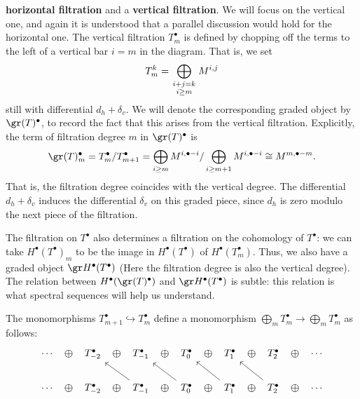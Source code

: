 \textbf{horizontal filtration} and a \textbf{vertical filtration}. We will focus on the vertical one, and again it is understood that a parallel discussion would hold 
for the horizontal one. The vertical filtration $T^\bullet_m$ is defined by chopping off the terms to the left of a vertical bar $i=m$ in the diagram. That is, we set
\[T_m^k=\bigoplus_{\substack{i+j=k\atop i\geq m}}M^{i,j}\]
still with differential $d_h+\delta_v$. We will denote the corresponding graded object by $\gr(T)^\bullet$, to record the fact that this arises from the 
vertical filtration. Explicitly, the term of filtration degree $m$ in $\gr(T)^\bullet$ is 
\[\gr(T)^\bullet_m=T^\bullet_m/T^\bullet_{m+1}=\bigoplus_{i\geq m}M^{i,\bullet-i}/\bigoplus_{i\geq m+1}M^{i,\bullet-i}\cong M^{m,\bullet-m}.\]
That is, the filtration degree coincides with the vertical degree. The differential $d_h+\delta_v$ induces the differential $\delta_v$ on this graded piece, since 
$d_h$ is zero modulo the next piece of the filtration.\par
The filtration on $T^\bullet$ also determines a filtration on the cohomology of $T^\bullet$: we can take $H^\bullet(T^\bullet)_m$ to be the image in 
$H^\bullet(T^\bullet)$ of $H^\bullet(T^\bullet_m)$. Thus, we also have a graded object $\gr H^\bullet(T^\bullet)$ (Here the filtration degree is also the vertical 
degree). The relation between $H^\bullet(\gr(T)^\bullet)$ and $\gr H^\bullet(T^\bullet)$ is subtle: this relation is what spectral sequences will help us understand.\par 
The monomorphisms $T^\bullet_{m+1}\hookrightarrow T^\bullet_m$ define a monomorphism $\bigoplus_mT^\bullet_m\to\bigoplus_mT^\bullet_m$ as follows:
\[\begin{tikzcd}
\cdots\ar[draw=none]{r}[name=X, anchor=center,scale=1.5]{\oplus}&T^\bullet_{-2}\ar[draw=none]{r}[name=X, anchor=center,scale=1.5]{\oplus}&T^\bullet_{-1}
\ar[draw=none]{r}[name=X, anchor=center,scale=1.5]{\oplus}&T^\bullet_0\ar[draw=none]{r}[name=X, anchor=center,scale=1.5]{\oplus}&T^\bullet_1
\ar[draw=none]{r}[name=X, anchor=center,scale=1.5]{\oplus}&T^\bullet_2\ar[draw=none]{r}[name=X, anchor=center,scale=1.5]{\oplus}&\cdots\\
\cdots\ar[draw=none]{r}[name=X, anchor=center,scale=1.5]{\oplus}&T^\bullet_{-2}\ar[draw=none]{r}[name=X, anchor=center,scale=1.5]{\oplus}&T^\bullet_{-1}
\ar[draw=none]{r}[name=X, anchor=center,scale=1.5]{\oplus}\ar[lu]&T^\bullet_0\ar[draw=none]{r}[name=X, anchor=center,scale=1.5]{\oplus}\ar[lu]&T^\bullet_1
\ar[draw=none]{r}[name=X, anchor=center,scale=1.5]{\oplus}\ar[lu]&T^\bullet_2\ar[draw=none]{r}[name=X, anchor=center,scale=1.5]{\oplus}\ar[lu]&\cdots
\end{tikzcd}\]
